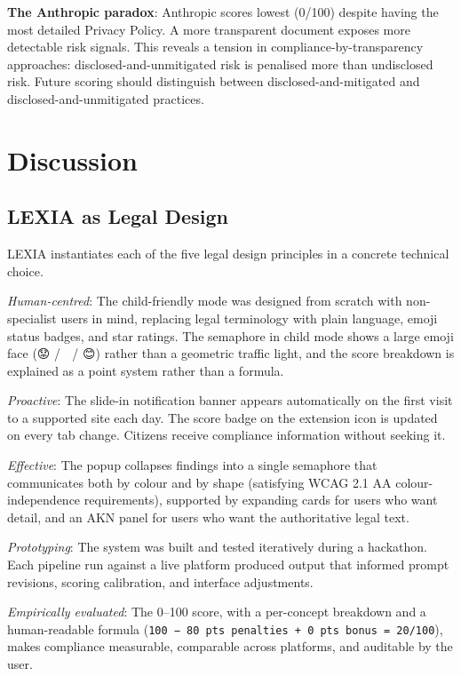 \documentclass[12pt, a4paper]{article}
\begin{document}
\textbf{The Anthropic paradox}: Anthropic scores lowest (0/100) despite having the most detailed Privacy Policy. A more transparent document exposes more detectable risk signals. This reveals a tension in compliance-by-transparency approaches: disclosed-and-unmitigated risk is penalised more than undisclosed risk. Future scoring should distinguish between disclosed-and-mitigated and disclosed-and-unmitigated practices.

\section{Discussion}

\subsection{LEXIA as Legal Design}

LEXIA instantiates each of the five legal design principles in a concrete technical choice.

\emph{Human-centred}: The child-friendly mode was designed from scratch with non-specialist users in mind, replacing legal terminology with plain language, emoji status badges, and star ratings. The semaphore in child mode shows a large emoji face (😟 / 🤔 / 😊) rather than a geometric traffic light, and the score breakdown is explained as a point system rather than a formula.

\emph{Proactive}: The slide-in notification banner appears automatically on the first visit to a supported site each day. The score badge on the extension icon is updated on every tab change. Citizens receive compliance information without seeking it.

\emph{Effective}: The popup collapses findings into a single semaphore that communicates both by colour and by shape (satisfying WCAG 2.1 AA colour-independence requirements), supported by expanding cards for users who want detail, and an AKN panel for users who want the authoritative legal text.

\emph{Prototyping}: The system was built and tested iteratively during a hackathon. Each pipeline run against a live platform produced output that informed prompt revisions, scoring calibration, and interface adjustments.

\emph{Empirically evaluated}: The 0--100 score, with a per-concept breakdown and a human-readable formula (\texttt{100 − 80 pts penalties + 0 pts bonus = 20/100}), makes compliance measurable, comparable across platforms, and auditable by the user.
\end{document}

